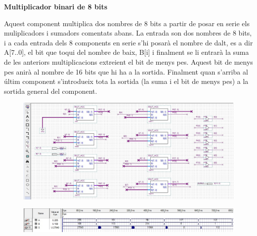 \documentclass[12pt, a4papre]{article}
\begin{document}
\begin{center}
\begin{center}
	\end{center}
	
	
	\textbf{\large{Multiplicador binari de 8 bits}}
	
	Aquest component multiplica dos nombres de 8 bits a partir de posar en serie els muliplicadors i sumadors comentats abans. La entrada son dos nombres de 8 bits, i a cada entrada dels 8 components en serie s'hi posarà el nombre de dalt, es a dir A[7..0], el bit que toqui del nombre de baix, B[i] i finalment se li entrarà la suma de les anteriors multiplicacions extreient el bit de menys pes. Aquest bit de menys pes anirà al nombre de 16 bits que hi ha a la sortida. Finalment quan s'arriba al últim component s'introdueix tota la sortida (la suma i el bit de menys pes) a la sortida general del component.
	
	\begin{center}
	\begin{figure}[H]
		\begin{center}
		\includegraphics[width=150mm]{multbin8bits.jpeg}
		\end{center}
	\end{figure}
	
	\end{center}
	
	\begin{center}
	\begin{figure}[H]
		\begin{center}
		\includegraphics[width=150mm]{multbin8bitssimul.jpeg}
		\end{center}
	\end{figure}
	
	\end{center}
	
	
	

\end{center}
\end{document}

